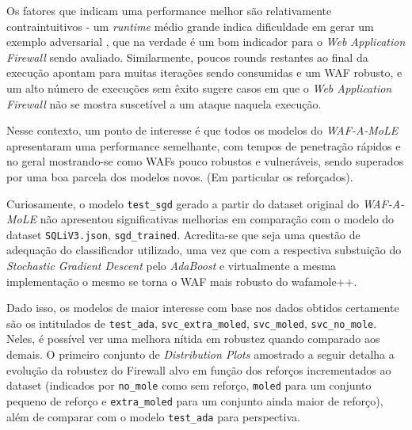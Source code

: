 Os fatores que indicam uma performance melhor são relativamente contraintuitivos - um \textit{runtime} médio grande indica dificuldade em gerar um exemplo adversarial \cite{adversarial_example}, que na verdade é um bom indicador para o \textit{Web Application Firewall} sendo avaliado. Similarmente, poucos rounds restantes ao final da execução apontam para muitas iterações sendo consumidas e um WAF robusto, e um alto número de execuções sem êxito sugere casos em que o \textit{Web Application Firewall} não se mostra suscetível a um ataque naquela execução. 

Nesse contexto, um ponto  de interesse é que todos os modelos do \textit{WAF-A-MoLE} apresentaram uma performance semelhante, com tempos de penetração rápidos e no geral mostrando-se como WAFs pouco robustos e vulneráveis, sendo superados por uma boa parcela dos modelos novos. (Em particular os reforçados).

Curiosamente, o modelo \verb+test_sgd+ gerado a partir do dataset original do \textit{WAF-A-MoLE} não apresentou significativas melhorias em comparação com o modelo do dataset \verb+SQLiV3.json+, \verb+sgd_trained+. Acredita-se que seja uma questão de adequação do classificador utilizado, uma vez que com a respectiva substuição do \textit{Stochastic Gradient Descent} pelo \textit{AdaBoost} e virtualmente a mesma implementação o mesmo se torna o WAF mais robusto do wafamole++.

Dado isso, os modelos de maior interesse com base nos dados obtidos certamente são os intitulados de \verb+test_ada+, \verb+svc_extra_moled+, \verb+svc_moled+, \verb+svc_no_mole+. Neles, é possível ver uma melhora nítida em robustez quando comparado aos demais. O primeiro conjunto de \textit{Distribution Plots} amostrado a seguir detalha a evolução da robustez do Firewall alvo em função dos reforços incrementados ao dataset (indicados por \verb+no_mole+ como sem reforço, \verb+moled+ para um conjunto pequeno de reforço e \verb+extra_moled+ para um conjunto ainda maior de reforço), além de comparar com o modelo \verb+test_ada+ para perspectiva. 

